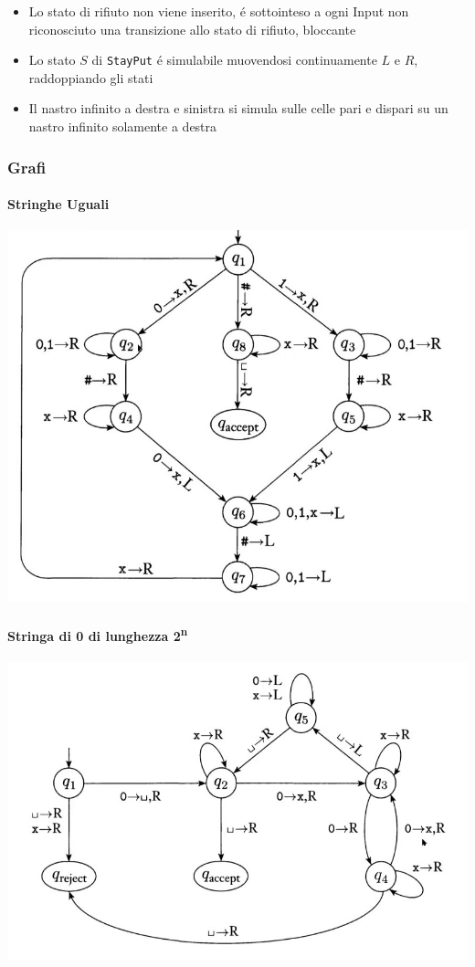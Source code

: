 \documentclass[
                        12pt, %
                        a4paper, %
                        oneside, %
                        headinclude,footinclude, %
                        BCOR5mm, %
                  ]{scrartcl}
\begin{document}
\begin{itemize}
\item Lo stato di rifiuto non viene inserito, é sottointeso a ogni Input non riconosciuto una transizione allo stato di rifiuto, bloccante
\item Lo stato \(S\) di \texttt{StayPut} é simulabile muovendosi continuamente \(L\) e \(R\), raddoppiando gli stati
\item Il nastro infinito a destra e sinistra si simula sulle celle pari e dispari su un nastro infinito solamente a destra
\end{itemize}

\subsubsection{Grafi}
\label{sec:orga811918}
\paragraph{Stringhe Uguali}
\label{sec:orge7bca39}
\begin{center}
\includegraphics[width=.9\linewidth]{../media/img/grafoEs1.jpg}
\end{center}
\paragraph{Stringa di 0 di lunghezza 2\textsuperscript{n}}
\label{sec:org7904beb}
\begin{center}
\includegraphics[width=.9\linewidth]{../media/img/graphPowerOfTwoLength.jpg}
\end{center}
\end{document}
